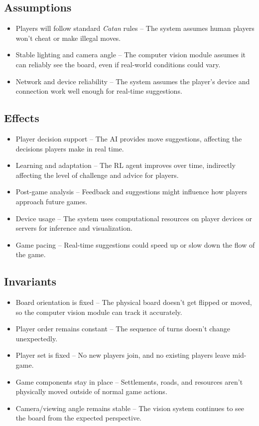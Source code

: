 \documentclass{article}
\begin{document}
\subsection{Assumptions}\label{subsec:assumptions}
\begin{itemize}
    \item {Players will follow standard \emph{Catan} rules} – The system assumes human players won’t cheat or make illegal moves.
    \item {Stable lighting and camera angle} – The computer vision module assumes it can reliably see the board, even if real-world conditions could vary.
    \item {Network and device reliability} – The system assumes the player’s device and connection work well enough for real-time suggestions.
\end{itemize}

\subsection{Effects}\label{subsec:effects}
\begin{itemize}
    \item {Player decision support} – The AI provides move suggestions, affecting the decisions players make in real time.
    \item {Learning and adaptation} – The RL agent improves over time, indirectly affecting the level of challenge and advice for players.
    \item {Post-game analysis} – Feedback and suggestions might influence how players approach future games.
    \item {Device usage} – The system uses computational resources on player devices or servers for inference and visualization.
    \item {Game pacing} – Real-time suggestions could speed up or slow down the flow of the game.
\end{itemize}

\subsection{Invariants}\label{subsec:invariants}
\begin{itemize}
    \item {Board orientation is fixed} – The physical board doesn’t get flipped or moved, so the computer vision module can track it accurately.
    \item {Player order remains constant} – The sequence of turns doesn’t change unexpectedly.
    \item {Player set is fixed} – No new players join, and no existing players leave mid-game.
    \item {Game components stay in place} – Settlements, roads, and resources aren’t physically moved outside of normal game actions.
    \item {Camera/viewing angle remains stable} – The vision system continues to see the board from the expected perspective.
\end{itemize}
\end{document}
